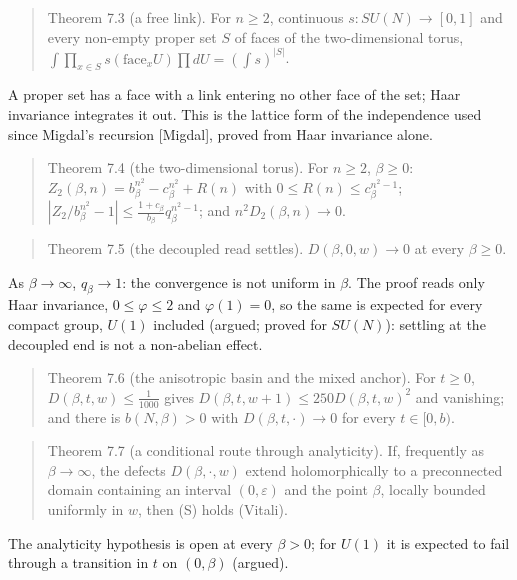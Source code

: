 \documentclass[10pt,letterpaper,twocolumn]{article}
\begin{document}
\begin{quote}
Theorem 7.3 (a free link). For \(n\ge2\), continuous \(s:SU(N)\to[0,1]\) and every non-empty proper set \(S\) of faces of the two-dimensional torus, \(\int\prod_{x\in S}s(\mathrm{face}_xU)\prod dU=(\int s)^{|S|}\).
\end{quote}

A proper set has a face with a link entering no other face of the set; Haar invariance integrates it out. This is the lattice form of the independence used since Migdal's recursion {[}Migdal{]}, proved from Haar invariance alone.

\begin{quote}
Theorem 7.4 (the two-dimensional torus). For \(n\ge2\), \(\beta\ge0\): \(Z_2(\beta,n)=b_\beta^{n^2}-c_\beta^{n^2}+R(n)\) with \(0\le R(n)\le c_\beta^{n^2-1}\); \(|Z_2/b_\beta^{n^2}-1|\le\tfrac{1+c_\beta}{b_\beta}q_\beta^{n^2-1}\); and \(n^2D_2(\beta,n)\to0\).
\end{quote}

\begin{quote}
Theorem 7.5 (the decoupled read settles). \(D(\beta,0,w)\to0\) at every \(\beta\ge0\).
\end{quote}

As \(\beta\to\infty\), \(q_\beta\to1\): the convergence is not uniform in \(\beta\). The proof reads only Haar invariance, \(0\le\varphi\le2\) and \(\varphi(1)=0\), so the same is expected for every compact group, \(U(1)\) included (argued; proved for \(SU(N)\)): settling at the decoupled end is not a non-abelian effect.

\begin{quote}
Theorem 7.6 (the anisotropic basin and the mixed anchor). For \(t\ge0\), \(D(\beta,t,w)\le\tfrac1{1000}\) gives \(D(\beta,t,w+1)\le250D(\beta,t,w)^2\) and vanishing; and there is \(b(N,\beta)>0\) with \(D(\beta,t,\cdot)\to0\) for every \(t\in[0,b)\).
\end{quote}

\begin{quote}
Theorem 7.7 (a conditional route through analyticity). If, frequently as \(\beta\to\infty\), the defects \(D(\beta,\cdot,w)\) extend holomorphically to a preconnected domain containing an interval \((0,\varepsilon)\) and the point \(\beta\), locally bounded uniformly in \(w\), then (S) holds (Vitali).
\end{quote}

The analyticity hypothesis is open at every \(\beta>0\); for \(U(1)\) it is expected to fail through a transition in \(t\) on \((0,\beta)\) (argued).
\end{document}
